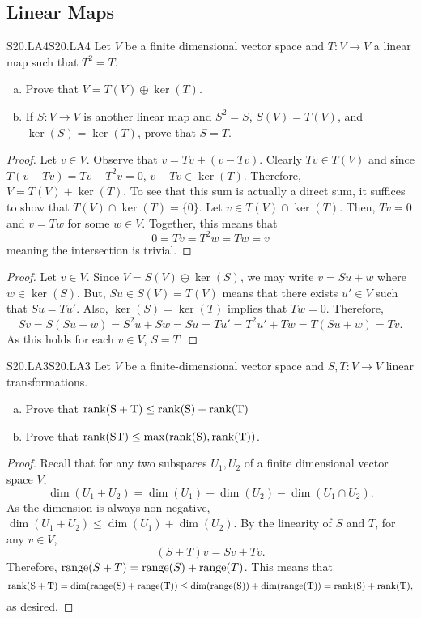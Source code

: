 \documentclass[../AlgebraQualSolutions.tex]{subfiles}
\begin{document}
\subsection{Linear Maps}

	\begin{prob}{S20.LA4}{S20.LA4}
		Let $V$ be a finite dimensional vector space and $T: V \to V$ a linear map such that $T^2 = T$.
		\begin{enumerate}[(a)]
			\item Prove that $V = T(V) \oplus \ker(T)$.
			\item If $S: V \to V$ is another linear map and $S^2 = S$, $S(V) = T(V)$, and $\ker(S) = \ker(T)$, prove that $S = T$.
		\end{enumerate}
	\end{prob}

	\begin{proof}
		Let $v \in V$. Observe that $v = Tv + (v - Tv)$. Clearly $Tv \in T(V)$ and since $T(v - Tv) = Tv - T^2v = 0$, $v - Tv \in \ker(T)$. Therefore, $V = T(V) + \ker(T)$. To see that this sum is actually a direct sum, it suffices to show that $T(V) \cap \ker(T) = \{0\}$. Let $v \in T(V) \cap \ker(T)$. Then, $Tv = 0$ and $v = Tw$ for some $w \in V$. Together, this means that
			\[0 = Tv = T^2w = Tw = v\]
		meaning the intersection is trivial.
	\end{proof}

	\begin{proof}
		Let $v \in V$. Since $V = S(V) \oplus \ker(S)$, we may write $v = Su + w$ where $w \in \ker(S)$. But, $Su \in S(V) = T(V)$ means that there exists $u' \in V$ such that $Su = Tu'$. Also, $\ker(S) = \ker(T)$ implies that $Tw = 0$. Therefore,
			\[Sv = S(Su + w) = S^2u + Sw = Su = Tu' = T^2u' + Tw = T(Su + w) = Tv.\]
		As this holds for each $v \in V$, $S = T$.
	\end{proof}

	\begin{prob}{S20.LA3}{S20.LA3}
		Let $V$ be a finite-dimensional vector space and $S,T: V \to V$ linear transformations.
		\begin{enumerate}[(a)]
			\item Prove that $\rm{rank}(S+T) \leq \rm{rank}(S) + \rm{rank}(T)$
			\item Prove that $\rm{rank}(ST) \leq \max(\rm{rank}(S), \rm{rank}(T))$.
		\end{enumerate}
	\end{prob}

	\begin{proof}
		Recall that for any two subspaces $U_1,U_2$ of a finite dimensional vector space $V$,
			\[\dim(U_1 + U_2) = \dim(U_1) + \dim(U_2) - \dim(U_1 \cap U_2).\]
		As the dimension is always non-negative, $\dim(U_1 + U_2) \leq \dim(U_1) + \dim(U_2)$. By the linearity of $S$ and $T$, for any $v \in V$,
			\[(S + T)v = Sv + Tv.\]
		Therefore, $\mathrm{range}(S + T) = \mathrm{range}(S) + \mathrm{range}(T)$. This means that
			\[\rm{rank}(S+T) = \dim(\mathrm{range}(S) + \mathrm{range}(T)) \leq \dim(\mathrm{range}(S)) + \dim(\mathrm{range}(T)) = \rm{rank}(S) + \rm{rank}(T),\]
		as desired.
	\end{proof}
\end{document}
